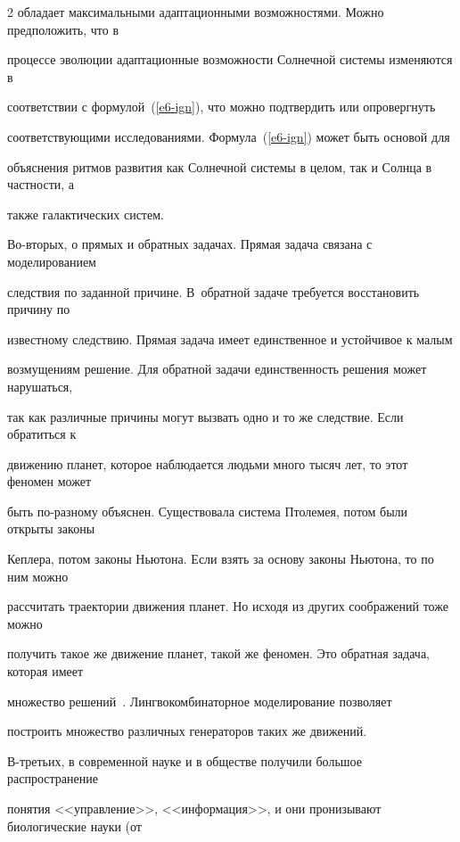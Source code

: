 \begin{multicols}{2}
обладает максимальными адаптационными возможностями. Можно предположить, что в 


процессе эволюции адаптационные возможности Солнечной сис\-те\-мы изменяются в 


соответствии с формулой~(\ref{e6-ign}), что можно подтвердить или опровергнуть 


соответствующими исследованиями. Формула~(\ref{e6-ign}) может быть основой для 


объяснения ритмов развития как Солнечной сис\-те\-мы в целом, так и Солнца в частности, а 


также галактических систем.


      


      Во-вторых, о прямых и обратных задачах. Прямая задача связана с моделированием 


следствия по заданной причине. В~обратной задаче требуется восстановить причину по 


известному следствию. Прямая задача имеет единственное и устойчивое к малым 


возмущениям решение. Для обратной задачи единственность решения может нарушаться, 


так как различные причины могут вызвать одно и то же следствие. Если обратиться к 


движению планет, которое наблюдается людьми много тысяч лет, то этот феномен может 


быть по-разному объяснен. Существовала сис\-те\-ма Птолемея, потом были открыты законы 


Кеплера, потом законы Ньютона. Если взять за основу законы Ньютона, то по ним можно 


рассчитать траектории движения планет. Но исходя из других соображений тоже можно 


получить такое же движение планет, такой же феномен. Это обратная задача, которая имеет 


множество решений~\cite{19-ign}. Линг\-во\-ком\-би\-на\-тор\-ное моделирование позволяет 


построить множество различных генераторов таких же движений.


      


      В-третьих, в современной науке и в обществе получили большое распространение 


понятия <<управ\-ле\-ние>>, <<информация>>, и они пронизывают биологические науки (от 



\end{multicols}
